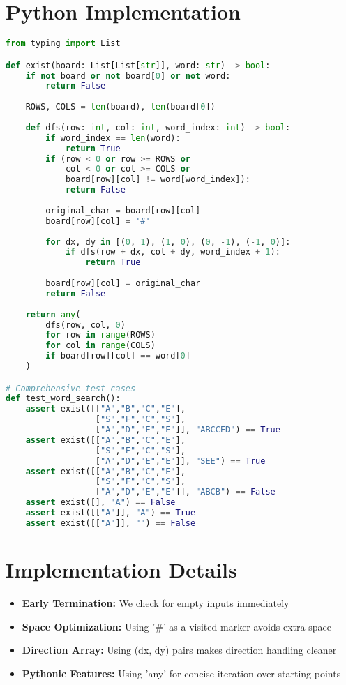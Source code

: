 
\section*{Python Implementation}
\begin{fullwidth}
\begin{lstlisting}[language=Python]
from typing import List

def exist(board: List[List[str]], word: str) -> bool:
    if not board or not board[0] or not word:
        return False
    
    ROWS, COLS = len(board), len(board[0])
    
    def dfs(row: int, col: int, word_index: int) -> bool:
        if word_index == len(word):
            return True
        if (row < 0 or row >= ROWS or 
            col < 0 or col >= COLS or 
            board[row][col] != word[word_index]):
            return False
        
        original_char = board[row][col]
        board[row][col] = '#'
        
        for dx, dy in [(0, 1), (1, 0), (0, -1), (-1, 0)]:
            if dfs(row + dx, col + dy, word_index + 1):
                return True
        
        board[row][col] = original_char
        return False
    
    return any(
        dfs(row, col, 0)
        for row in range(ROWS)
        for col in range(COLS)
        if board[row][col] == word[0]
    )

# Comprehensive test cases
def test_word_search():
    assert exist([["A","B","C","E"],
                  ["S","F","C","S"],
                  ["A","D","E","E"]], "ABCCED") == True
    assert exist([["A","B","C","E"],
                  ["S","F","C","S"],
                  ["A","D","E","E"]], "SEE") == True
    assert exist([["A","B","C","E"],
                  ["S","F","C","S"],
                  ["A","D","E","E"]], "ABCB") == False
    assert exist([], "A") == False
    assert exist([["A"]], "A") == True
    assert exist([["A"]], "") == False
\end{lstlisting}
\end{fullwidth}

\section*{Implementation Details}
\begin{itemize}
    \item \textbf{Early Termination:} We check for empty inputs immediately
    \item \textbf{Space Optimization:} Using '\#' as a visited marker avoids extra space
    \item \textbf{Direction Array:} Using (dx, dy) pairs makes direction handling cleaner
    \item \textbf{Pythonic Features:} Using 'any' for concise iteration over starting points
\end{itemize}

